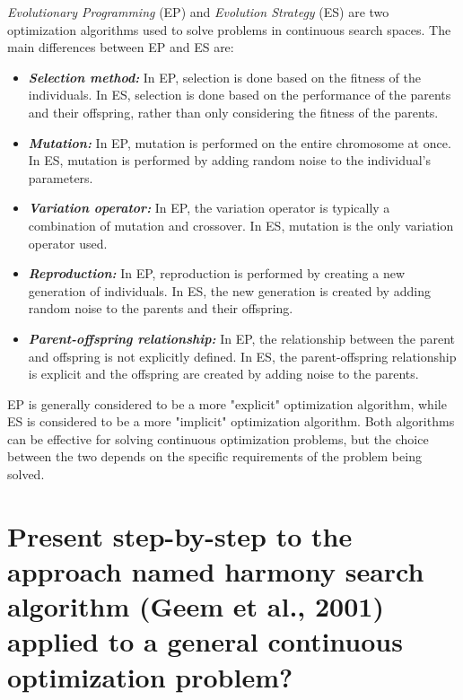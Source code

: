 \documentclass[conference]{IEEEtran}
\begin{document}
\textit{Evolutionary Programming }(EP) and \textit{Evolution Strategy} (ES) are two optimization algorithms used to solve problems in continuous search spaces. The main differences between EP and ES are:

\begin{itemize}
	\item \textbf{\textit{Selection method:}} In EP, selection is done based on the fitness of the individuals. In ES, selection is done based on the performance of the parents and their offspring, rather than only considering the fitness of the parents.
	
	\item \textbf{\textit{Mutation:}} In EP, mutation is performed on the entire chromosome at once. In ES, mutation is performed by adding random noise to the individual's parameters.
	
	\item \textbf{\textit{Variation operator:}} In EP, the variation operator is typically a combination of mutation and crossover. In ES, mutation is the only variation operator used.
	
	\item \textbf{\textit{Reproduction:}} In EP, reproduction is performed by creating a new generation of individuals. In ES, the new generation is created by adding random noise to the parents and their offspring.
	
	\item \textbf{\textit{Parent-offspring relationship:}} In EP, the relationship between the parent and offspring is not explicitly defined. In ES, the parent-offspring relationship is explicit and the offspring are created by adding noise to the parents.
\end{itemize}

EP is generally considered to be a more "explicit" optimization algorithm, while ES is considered to be a more "implicit" optimization algorithm. Both algorithms can be effective for solving continuous optimization problems, but the choice between the two depends on the specific requirements of the problem being solved.

\section{Present step-by-step to the approach named harmony search algorithm (Geem et al., 2001) applied to a general continuous optimization problem?}
\end{document}
